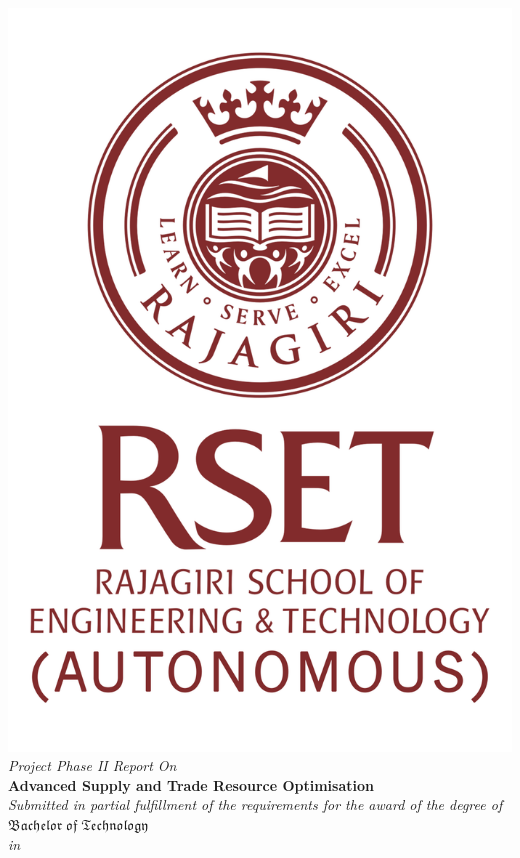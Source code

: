 \begin{center}
	\includegraphics[scale=0.35]{Figures/logo1.png}\\[0.5cm]
	\large \textit{Project Phase II Report On}\\[0.5cm]
	\Large \textbf{Advanced Supply and Trade Resource Optimisation}\\[0.5cm]
	\textit{Submitted in partial fulfillment of the
		requirements for the award of the degree of}\\[0.5cm]
	{\huge {$\mathfrak {Bachelor\; of\; Technology}$}}\\[.5cm]
	\textit{in}\\[.5cm]

\end{center}
